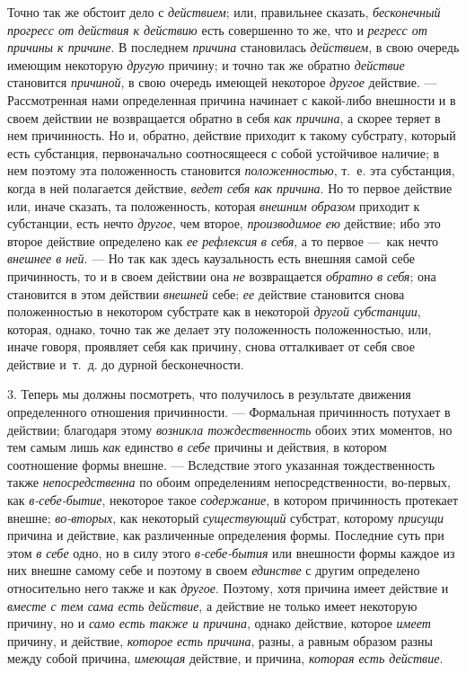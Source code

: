 Точно так же обстоит дело с {\em действием}; или,
правильнее сказать, {\em бесконечный прогресс от
действия к действию} есть совершенно то же, что и
{\em регресс от причины к причине}. В последнем
{\em причина} становилась
{\em действием}, в свою очередь имеющим некоторую
{\em другую} причину; и точно так же обратно
{\em действие} становится
{\em причиной}, в свою очередь имеющей некоторое
{\em другое} действие. — Рассмотренная нами
определенная причина начинает с какой-либо внешности и в своем действии не
возвращается обратно в себя {\em как причина}, а скорее
теряет в нем причинность. Но и, обратно, действие приходит к такому
субстрату, который есть субстанция, первоначально соотносящееся с собой
устойчивое наличие; в нем поэтому эта положенность становится
{\em положенностью}, т.~е. эта субстанция, когда в ней
полагается действие, {\em ведет себя как причина}. Но
то первое действие или, иначе сказать, та положенность, которая
{\em внешним образом} приходит к субстанции, есть нечто
{\em другое}, чем второе,
{\em производимое ею} действие; ибо это второе действие
определено как {\em ее рефлексия}
{\em в себя}, а то первое —~как нечто
{\em внешнее в ней}. — Но так как здесь каузальность
есть внешняя самой себе причинность, то и в своем действии она
{\em не} возвращается {\em обратно
в себя}; она становится в этом действии {\em внешней}
себе; {\em ее} действие становится снова положенностью
в некотором субстрате как в некоторой {\em другой
субстанции}, которая, однако, точно так же делает эту положенность
положенностью, или, иначе говоря, проявляет себя как причину, снова
отталкивает от себя свое действие и~т.~д. до дурной бесконечности.

3. Теперь мы должны посмотреть, что получилось в результате движения
определенного отношения причинности. — Формальная причинность потухает в
действии; благодаря этому {\em возникла
тождественность} обоих этих моментов, но тем самым лишь
{\em как} единство {\em в себе}
причины и действия, в котором соотношение формы внешне. — Вследствие этого
указанная тождественность также {\em непосредственна}
по обоим определениям непосредственности, во-первых, как
{\em в-себе-бытие}, некоторое такое
{\em содержание}, в котором причинность протекает
внешне; {\em во-вторых}, как некоторый
{\em существующий} субстрат, которому
{\em присущи} причина и действие, как различенные
определения формы. Последние суть при этом {\em в себе}
одно, но в силу этого {\em в-себе-бытия} или внешности
формы каждое из них внешне самому себе и поэтому в своем
{\em единстве} с другим определено относительно него
также и как {\em другое}. Поэтому, хотя причина имеет
действие и {\em вместе с тем сама есть действие}, а
действие не только имеет некоторую причину, но и
{\em само есть также и причина}, однако действие,
которое {\em имеет} причину, и действие,
{\em которое есть причина}, разны, а равным образом
разны между собой причина, {\em имеющая} действие, и
причина, {\em которая есть действие}.

